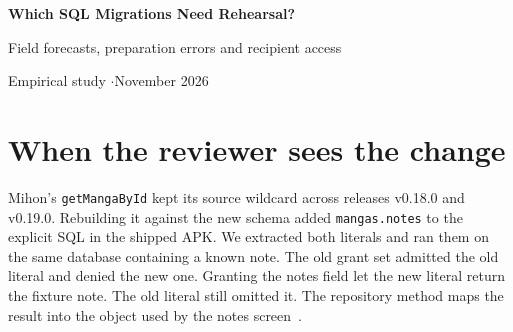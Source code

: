 \documentclass[11pt,a4paper]{article}
\newcommand{\code}[1]{\texttt{#1}}
\begin{document}
\begin{center}
{\LARGE\bfseries Which SQL Migrations Need Rehearsal?\par}
\vspace{4pt}
{\large Field forecasts, preparation errors and recipient access\par}
\vspace{6pt}
{\small Empirical study \enspace$\cdot$\enspace November 2026}
\end{center}

\begin{abstract}
An unchanged query can acquire access to private data after a rebuild. We compare preparing old SQL on a planned schema with forecasts made from schema changes and query syntax. A selective rehearsal rule reproduced every added-field list in five discovery histories using seven native rehearsals. We froze the rule before testing three further project histories. Across 425 old-query comparisons it selected no rehearsals, disagreed with full rehearsal four times, and predicted the next fields correctly in all four disagreements. It supplied none of the 18 native preparation errors. Cold syntax analysis took longer than native preparation on both machines. Extending the SQLite model recovered 148 previously incomplete database transitions. For these, full-column coverage and broad table diff installed identical policies, admitting the entire next catalog in 126 transitions. An Android wallet export demonstrates why an internal query's required reads and a recipient's permitted fields demand separate decisions.
\end{abstract}

\section{When the reviewer sees the change}
Mihon's \code{getMangaById} kept its source wildcard across releases v0.18.0 and v0.19.0. Rebuilding it against the new schema added \code{mangas.notes} to the explicit SQL in the shipped APK. We extracted both literals and ran them on the same database containing a known note. The old grant set admitted the old literal and denied the new one. Granting the notes field let the new literal return the fixture note. The old literal still omitted it. The repository method maps the result into the object used by the notes screen~\cite{mihon}.
\end{document}
